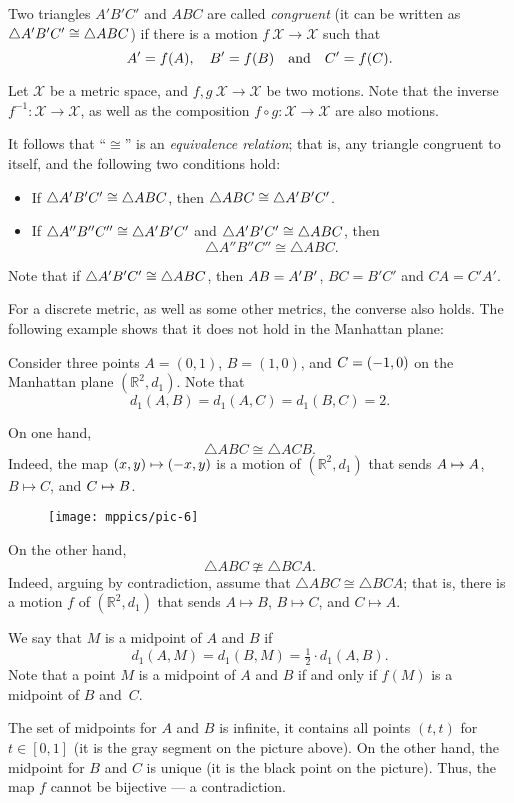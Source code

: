 Two triangles $A' B' C'$ and $A B C$ are called 
\emph{congruent}
(it can be written as $\triangle A' B' C'\z\cong\triangle A B C$) if there is a motion $f\:\mathcal{X}\to\mathcal{X}$ such that 
\[A'\z=f(A),
\quad
B'=f(B)
\quad
\text{and}
\quad
C'=f(C).\]

Let $\mathcal X$ be a metric space,
and $f,g\:\mathcal X\to\mathcal X$ be two motions.
Note that the inverse $f^{-1}:\mathcal X\to\mathcal X$,
as well as the composition $f\circ g:\mathcal X\to\mathcal X$
are also motions.

It follows that ``$\cong$'' is an \emph{equivalence relation};
that is, any triangle congruent to itself, 
and the following two conditions hold:
\begin{itemize} 
\item If $\triangle A' B' C'\z\cong\triangle A B C$, then $\triangle A B C\z\cong\triangle A' B' C'$.
\item If $\triangle A'' B'' C''\z\cong\triangle A' B' C'$ and $\triangle A' B' C'\z\cong\triangle A B C$,
then 
$$\triangle A'' B'' C''\cong\triangle A B C.$$
\end{itemize}


Note that if $\triangle A' B' C'\z\cong\triangle A B C$,
then $AB\z=A'B'$,
$BC=B'C'$ and $CA=C'A'$.

For a discrete metric, as well as some other metrics, 
the converse also holds.
The following example shows that it does not hold in the Manhattan plane:

\label{example:isometric but not congruent} Consider three points 
$A=(0,1)$, $B=(1,0)$, and $C\z=(-1,0)$ on the Manhattan plane $(\mathbb{R}^2,d_1)$.
Note that
$$d_1(A,B)=d_1(A,C)=d_1(B,C)=2.$$

On one hand,
$$\triangle ABC\cong \triangle ACB.$$
Indeed, the map $(x,y)\z\mapsto (-x,y)$ is a motion of $(\mathbb{R}^2,d_1)$
that sends $A\z\mapsto A$, $B\mapsto C$, and $C\z\mapsto B$.

\begin{wrapfigure}[6]{o}{33mm}
\vskip-4mm
\centering
\texttt{[image: mppics/pic-6]}
\end{wrapfigure}

On the other hand,
$$\triangle ABC\ncong \triangle BCA.$$
Indeed, arguing by contradiction, assume that $\triangle ABC\cong \triangle BCA$; that is, there is a motion $f$ of $(\mathbb{R}^2,d_1)$ that sends $A\mapsto B$, $B\mapsto C$, and $C\mapsto A$.


We say that $M$ is a midpoint of $A$ and $B$ if 
\[d_1(A,M)=d_1(B,M)=\tfrac12\cdot d_1(A,B).\]
Note that a point $M$ is a midpoint of $A$ and $B$ if and only if $f(M)$ is a midpoint of $B$ and~$C$.

The set of midpoints for $A$ and $B$ is infinite, it contains all points $(t,t)$ for $t\in[0,1]$ (it is the gray segment on the picture above).
On the other hand, the midpoint for $B$ and $C$ is unique (it is the black point on the picture).
Thus, the map $f$ cannot be bijective --- a contradiction.

